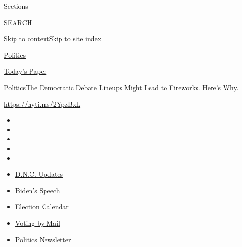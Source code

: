 Sections

SEARCH

\protect\hyperlink{site-content}{Skip to
content}\protect\hyperlink{site-index}{Skip to site index}

\href{https://www.nytimes3xbfgragh.onion/section/politics}{Politics}

\href{https://myaccount.nytimes3xbfgragh.onion/auth/login?response_type=cookie\&client_id=vi}{}

\href{https://www.nytimes3xbfgragh.onion/section/todayspaper}{Today's
Paper}

\href{/section/politics}{Politics}\textbar{}The Democratic Debate
Lineups Might Lead to Fireworks. Here's Why.

\url{https://nyti.ms/2YpzBxL}

\begin{itemize}
\item
\item
\item
\item
\item
\end{itemize}

\begin{itemize}
\item
  \href{https://www.nytimes3xbfgragh.onion/live/2020/08/21/us/dnc-convention-election?action=click\&pgtype=Article\&state=default\&region=TOP_BANNER\&context=storylines_menu}{D.N.C.
  Updates}
\item
  \href{https://www.nytimes3xbfgragh.onion/2020/08/20/us/politics/biden-presidential-nomination-dnc.html?action=click\&pgtype=Article\&state=default\&region=TOP_BANNER\&context=storylines_menu}{Biden's
  Speech}
\item
  \href{https://www.nytimes3xbfgragh.onion/interactive/2019/us/elections/2020-presidential-election-calendar.html?action=click\&pgtype=Article\&state=default\&region=TOP_BANNER\&context=storylines_menu}{Election
  Calendar}
\item
  \href{https://www.nytimes3xbfgragh.onion/interactive/2020/08/11/us/politics/vote-by-mail-us-states.html?action=click\&pgtype=Article\&state=default\&region=TOP_BANNER\&context=storylines_menu}{Voting
  by Mail}
\item
  \href{https://www.nytimes3xbfgragh.onion/newsletters/politics?action=click\&pgtype=Article\&state=default\&region=TOP_BANNER\&context=storylines_menu}{Politics
  Newsletter}
\end{itemize}

